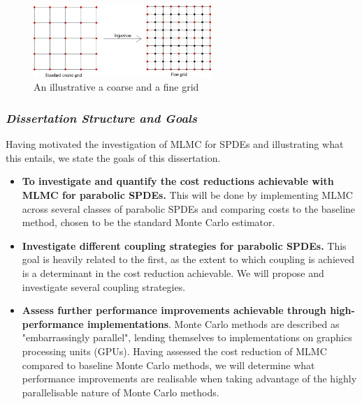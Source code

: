 \begin{figure}[htbp]
    \centering
    \includegraphics[width=0.6\textwidth]{graphics/fine_grid_vs_coarse_grid.png}
    \caption{An illustrative a coarse and a fine grid}
    \label{fig:coarse_vs_fine_grid}
\end{figure}



\subsubsection*{\textit{Dissertation Structure and Goals}}

Having motivated the investigation of MLMC for SPDEs and illustrating
what this entails, we state the goals of this dissertation.

\begin{itemize}
    \item \textbf{To investigate and quantify the cost reductions achievable with MLMC for 
          parabolic SPDEs.} This will be done by implementing MLMC across 
          several classes of parabolic SPDEs and comparing costs to the baseline method,
          chosen to be the standard Monte Carlo estimator.
    \item \textbf{Investigate different coupling strategies for parabolic SPDEs.}
          This goal is heavily related to the first, as the extent to which coupling 
          is achieved is a determinant in the cost reduction achievable. We will propose
          and investigate several coupling strategies.
    \item \textbf{Assess further performance improvements achievable through high-
          performance implementations}.
          Monte Carlo methods are described as "embarrassingly parallel", lending 
          themselves to implementations on graphics processing units (GPUs). 
          Having assessed the cost reduction of MLMC compared to baseline Monte Carlo 
          methods, we will determine what performance improvements are
          realisable when taking advantage of the highly parallelisable nature of Monte 
          Carlo methods.
\end{itemize}

